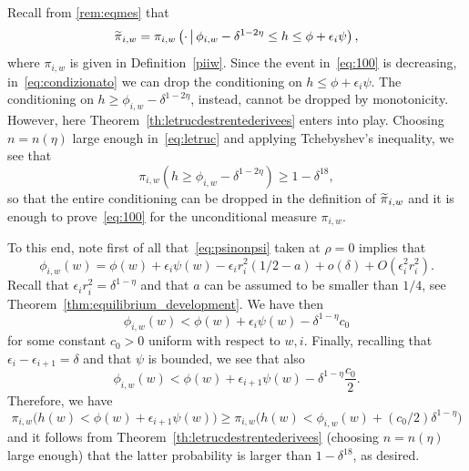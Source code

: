 \documentclass[AHL,Unicode,longabstracts,published]{cedram}
\newcommand{\eps}{\epsilon}
\let\oldtilde\tilde
\renewcommand*{\tilde}[1]{\mathchoice{\widetilde{#1}}{\widetilde{#1}}{\oldtilde{#1}}{\oldtilde{#1}}}
\begin{document}
Recall from \cref{rem:eqmes} that
\begin{equation}\label{eq:condizionato}
\tilde\pi_{i,w}=\pi_{i,w}\left(\cdot\,\middle|\,\phi_{i,w}-\delta^{1-2\eta}\le h\le \phi+\epsilon_i\psi\right),
\end{equation}
where $\pi_{i,w}$ is given in Definition~\ref{piiw}. Since the event in~\eqref{eq:100} is decreasing, in~\eqref{eq:condizionato} we can drop the conditioning on $h\le \phi+\epsilon_i\psi$. The conditioning on $h\ge \phi_{i,w}-\delta^{1-2\eta}$, instead, cannot be dropped by monotonicity. However, here Theorem~\ref{th:letrucdestrentederivees} enters into play. Choosing $n=n(\eta)$ large enough in~\eqref{eq:letruc} and applying Tchebyshev's inequality, we see that
\begin{equation}
\pi_{i,w}\left(h\ge \phi_{i,w}-\delta^{1-2\eta}\right)\ge 1-\delta^{18},
\end{equation}
so that the entire conditioning can be dropped in the definition of $\tilde\pi_{i,w}$ and it is enough to prove~\eqref{eq:100} for the unconditional measure $\pi_{i,w}$.

To this end, note first of all that~\eqref{eq:psinonpsi} taken at $\rho=0$ implies that
\begin{equation}
\phi_{i,w}(w)= \phi(w)+\epsilon_i\psi(w)-\epsilon_ir_i^2 (1/2-a)+o(\delta)+O\left(\epsilon_i^2r_i^2\right).
\end{equation}
Recall that $\epsilon_ir_i^2=\delta^{1-\eta}$ and that $a$ can be assumed to be smaller than $1/4$, see Theorem~\ref{thm:equilibrium_development}. We have then
\begin{equation}
\phi_{i,w}(w)< \phi(w)+\epsilon_i\psi(w)-\delta^{1-\eta} c_0
\end{equation}
for some constant $c_0>0$ uniform with respect to $w,i$. Finally, recalling that $\epsilon_i-\epsilon_{i+1}=\delta$ and that $\psi$ is bounded, we see that also
\begin{equation}
\phi_{i,w}(w)< \phi(w)+\epsilon_{i+1}\psi(w)-\delta^{1-\eta} \frac{c_0}2.
\end{equation}
Therefore, we have
\begin{equation}
\pi_{i,w}\big(h(w) < \phi(w) + \eps_{i+1} \psi(w) \big)\ge
\pi_{i,w}\big(h(w) < \phi_{i,w}(w)+(c_0/2)\delta^{1-\eta} \big)
\end{equation}
and it follows from Theorem~\ref{th:letrucdestrentederivees} (choosing $n=n(\eta)$ large enough) that the latter probability is larger than $1-\delta^{18}$, as desired.
\end{document}
